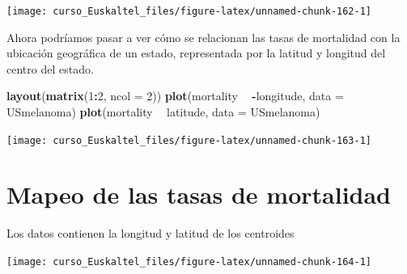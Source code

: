 \documentclass[]{book}
\newenvironment{Shaded}{\begin{snugshade}}{\end{snugshade}}
\newcommand{\KeywordTok}[1]{\textcolor[rgb]{0.13,0.29,0.53}{\textbf{#1}}}
\newcommand{\DataTypeTok}[1]{\textcolor[rgb]{0.13,0.29,0.53}{#1}}
\newcommand{\DecValTok}[1]{\textcolor[rgb]{0.00,0.00,0.81}{#1}}
\newcommand{\FloatTok}[1]{\textcolor[rgb]{0.00,0.00,0.81}{#1}}
\newcommand{\StringTok}[1]{\textcolor[rgb]{0.31,0.60,0.02}{#1}}
\newcommand{\OperatorTok}[1]{\textcolor[rgb]{0.81,0.36,0.00}{\textbf{#1}}}
\newcommand{\NormalTok}[1]{#1}
\begin{document}
\begin{center}\texttt{[image: curso\_Euskaltel\_files/figure-latex/unnamed-chunk-162-1]} \end{center}

Ahora podríamos pasar a ver cómo se relacionan las tasas de mortalidad
con la ubicación geográfica de un estado, representada por la latitud y
longitud del centro del estado.

\begin{Shaded}
\begin{Highlighting}[]
\KeywordTok{layout}\NormalTok{(}\KeywordTok{matrix}\NormalTok{(}\DecValTok{1}\OperatorTok{:}\DecValTok{2}\NormalTok{, }\DataTypeTok{ncol =} \DecValTok{2}\NormalTok{))}
\KeywordTok{plot}\NormalTok{(mortality }\OperatorTok{~}\StringTok{ }\OperatorTok{-}\NormalTok{longitude, }\DataTypeTok{data =}\NormalTok{ USmelanoma)}
\KeywordTok{plot}\NormalTok{(mortality }\OperatorTok{~}\StringTok{ }\NormalTok{latitude, }\DataTypeTok{data =}\NormalTok{ USmelanoma)}
\end{Highlighting}
\end{Shaded}

\begin{center}\texttt{[image: curso\_Euskaltel\_files/figure-latex/unnamed-chunk-163-1]} \end{center}

\section{Mapeo de las tasas de
mortalidad}\label{mapeo-de-las-tasas-de-mortalidad}

Los datos contienen la longitud y latitud de los centroides

\begin{Shaded}
\end{Shaded}

\begin{center}\texttt{[image: curso\_Euskaltel\_files/figure-latex/unnamed-chunk-164-1]} \end{center}
\end{document}
